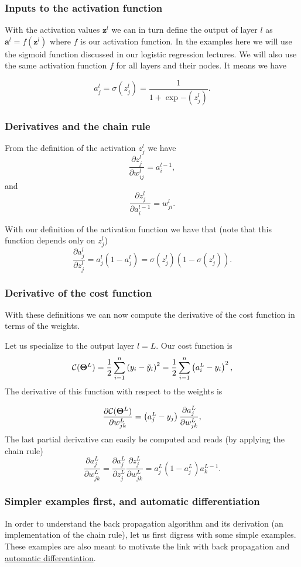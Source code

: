 \documentclass{beamer}
\begin{document}
\begin{frame}
\frametitle{Inputs to the activation function}

With the activation values $\bm{z}^l$ we can in turn define the
output of layer $l$ as $\bm{a}^l = f(\bm{z}^l)$ where $f$ is our
activation function. In the examples here we will use the sigmoid
function discussed in our logistic regression lectures. We will also use the same activation function $f$ for all layers
and their nodes.  It means we have

\[
a_j^l = \sigma(z_j^l) = \frac{1}{1+\exp{-(z_j^l)}}.
\]
\end{frame}

\begin{frame}
\frametitle{Derivatives and the chain rule}

From the definition of the activation $z_j^l$ we have
\[
\frac{\partial z_j^l}{\partial w_{ij}^l} = a_i^{l-1},
\]
and
\[
\frac{\partial z_j^l}{\partial a_i^{l-1}} = w_{ji}^l. 
\]

With our definition of the activation function we have that (note that this function depends only on $z_j^l$)
\[
\frac{\partial a_j^l}{\partial z_j^{l}} = a_j^l(1-a_j^l)=\sigma(z_j^l)(1-\sigma(z_j^l)). 
\]
\end{frame}

\begin{frame}
\frametitle{Derivative of the cost function}

With these definitions we can now compute the derivative of the cost function in terms of the weights.

Let us specialize to the output layer $l=L$. Our cost function is
\[
{\cal C}(\bm{\Theta}^L)  =  \frac{1}{2}\sum_{i=1}^n\left(y_i - \tilde{y}_i\right)^2=\frac{1}{2}\sum_{i=1}^n\left(a_i^L - y_i\right)^2, 
\]
The derivative of this function with respect to the weights is

\[
\frac{\partial{\cal C}(\bm{\Theta}^L)}{\partial w_{jk}^L}  =  \left(a_j^L - y_j\right)\frac{\partial a_j^L}{\partial w_{jk}^{L}}, 
\]
The last partial derivative can easily be computed and reads (by applying the chain rule)
\[
\frac{\partial a_j^L}{\partial w_{jk}^{L}} = \frac{\partial a_j^L}{\partial z_{j}^{L}}\frac{\partial z_j^L}{\partial w_{jk}^{L}}=a_j^L(1-a_j^L)a_k^{L-1}.  
\]
\end{frame}

\begin{frame}
\frametitle{Simpler examples first, and automatic differentiation}

In order to understand the back propagation algorithm and its
derivation (an implementation of the chain rule), let us first digress
with some simple examples. These examples are also meant to motivate
the link with back propagation and \href{{https://en.wikipedia.org/wiki/Automatic_differentiation}}{automatic differentiation}.
\end{frame}
\end{document}
